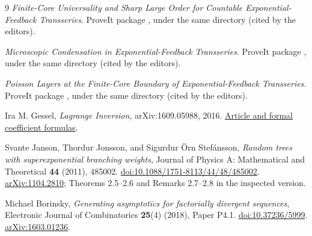 \documentclass[11pt,a4paper]{article}
\theoremstyle{definition}
\theoremstyle{remark}
\numberwithin{equation}{section}
\begin{document}
\begin{thebibliography}{9}
\emph{Finite-Core Universality and Sharp Large Order for Countable
Exponential-Feedback Transseries}.
ProveIt package ,
under the same directory (cited by the editors).

\emph{Microscopic Condensation in Exponential-Feedback Transseries}.
ProveIt package ,
under the same directory (cited by the editors).

\emph{Poisson Layers at the Finite-Core Boundary of Exponential-Feedback
Transseries}.
ProveIt package ,
under the same directory (cited by the editors).

Ira M. Gessel,
\emph{Lagrange Inversion},
arXiv:1609.05988, 2016.
\href{https://arxiv.org/abs/1609.05988}{Article and formal coefficient formulas}.

Svante Janson, Thordur Jonsson, and Sigurdur \"Orn Stef\'ansson,
\emph{Random trees with superexponential branching weights},
Journal of Physics A: Mathematical and Theoretical
\textbf{44} (2011), 485002.
\href{https://doi.org/10.1088/1751-8113/44/48/485002}{doi:10.1088/1751-8113/44/48/485002}.
\href{https://arxiv.org/abs/1104.2810}{arXiv:1104.2810};
Theorems 2.5--2.6 and Remarks 2.7--2.8 in the inspected version.

Michael Borinsky,
\emph{Generating asymptotics for factorially divergent sequences},
Electronic Journal of Combinatorics \textbf{25}(4) (2018), Paper P4.1.
\href{https://doi.org/10.37236/5999}{doi:10.37236/5999}.
\href{https://arxiv.org/abs/1603.01236}{arXiv:1603.01236}.
\end{thebibliography}
\end{document}
